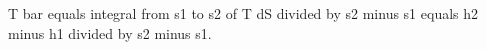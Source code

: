 T bar equals integral from s1 to s2 of T dS divided by s2 minus s1 equals h2 minus h1 divided by s2 minus s1.